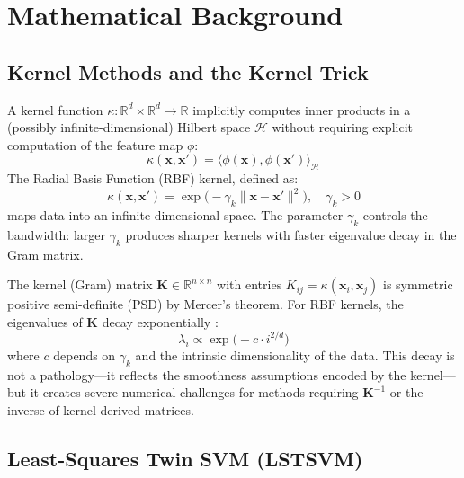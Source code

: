 \documentclass[journal]{IEEEtran}
\begin{document}
\section{Mathematical Background}
\label{sec:background}

\subsection{Kernel Methods and the Kernel Trick}

A kernel function $\kappa: \mathbb{R}^d \times \mathbb{R}^d \to \mathbb{R}$ implicitly computes inner products in a (possibly infinite-dimensional) Hilbert space $\mathcal{H}$ without requiring explicit computation of the feature map $\phi$:
\begin{equation}
\kappa(\bm{x}, \bm{x}') = \langle \phi(\bm{x}), \phi(\bm{x}') \rangle_\mathcal{H}
\end{equation}
The Radial Basis Function (RBF) kernel, defined as:
\begin{equation}
\kappa(\bm{x}, \bm{x}') = \exp\bigl(-\gamma_k \|\bm{x} - \bm{x}'\|^2\bigr), \quad \gamma_k > 0
\label{eq:rbf_kernel}
\end{equation}
maps data into an infinite-dimensional space. The parameter $\gamma_k$ controls the bandwidth: larger $\gamma_k$ produces sharper kernels with faster eigenvalue decay in the Gram matrix.

The kernel (Gram) matrix $\bm{K} \in \mathbb{R}^{n \times n}$ with entries $K_{ij} = \kappa(\bm{x}_i, \bm{x}_j)$ is symmetric positive semi-definite (PSD) by Mercer's theorem. For RBF kernels, the eigenvalues of $\bm{K}$ decay exponentially \cite{hofmann2008kernel}:
\begin{equation}
\lambda_i \propto \exp\bigl(-c \cdot i^{2/d}\bigr)
\label{eq:eigenvalue_decay}
\end{equation}
where $c$ depends on $\gamma_k$ and the intrinsic dimensionality of the data. This decay is not a pathology---it reflects the smoothness assumptions encoded by the kernel---but it creates severe numerical challenges for methods requiring $\bm{K}^{-1}$ or the inverse of kernel-derived matrices.

\subsection{Least-Squares Twin SVM (LSTSVM)}
\label{sec:lstsvm_background}
\end{document}
